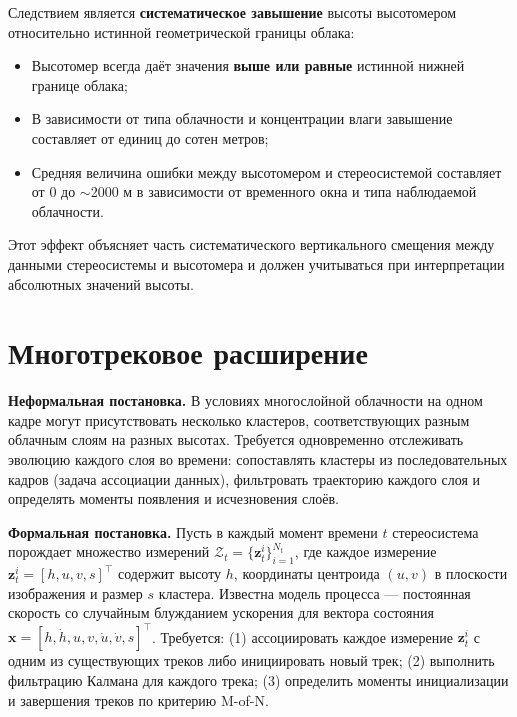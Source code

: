 \documentclass[11pt]{article} %
\begin{document}
	Следствием является \textbf{систематическое завышение} высоты высотомером относительно истинной геометрической границы облака:
	\begin{itemize}
		\item Высотомер всегда даёт значения \textbf{выше или равные} истинной нижней границе облака;
		\item В зависимости от типа облачности и концентрации влаги завышение составляет от единиц до сотен метров;
		\item Средняя величина ошибки между высотомером и стереосистемой составляет от 0 до $\sim$2000 м в зависимости от временного окна и типа наблюдаемой облачности.
	\end{itemize}
	
	Этот эффект объясняет часть систематического вертикального смещения между данными стереосистемы и высотомера и должен учитываться при интерпретации абсолютных значений высоты.
	
	\pagebreak
	
\section{Многотрековое расширение}
\vspace{3mm}\hspace{5mm}

\textbf{Неформальная постановка.} В условиях многослойной облачности на одном кадре могут присутствовать несколько кластеров, соответствующих разным облачным слоям на разных высотах. Требуется одновременно отслеживать эволюцию каждого слоя во времени: сопоставлять кластеры из последовательных кадров (задача ассоциации данных), фильтровать траекторию каждого слоя и определять моменты появления и исчезновения слоёв.

\textbf{Формальная постановка.} Пусть в каждый момент времени $t$ стереосистема порождает множество измерений $\mathcal{Z}_t = \{\mathbf{z}_t^i\}_{i=1}^{N_t}$, где каждое измерение $\mathbf{z}_t^i = [h, u, v, s]^\top$ содержит высоту $h$, координаты центроида $(u, v)$ в плоскости изображения и размер $s$ кластера. Известна модель процесса — постоянная скорость со случайным блужданием ускорения для вектора состояния $\mathbf{x} = [h, \dot{h}, u, v, \dot{u}, \dot{v}, s]^\top$. Требуется: (1) ассоциировать каждое измерение $\mathbf{z}_t^i$ с одним из существующих треков либо инициировать новый трек; (2) выполнить фильтрацию Калмана для каждого трека; (3) определить моменты инициализации и завершения треков по критерию M-of-N.
\end{document}
